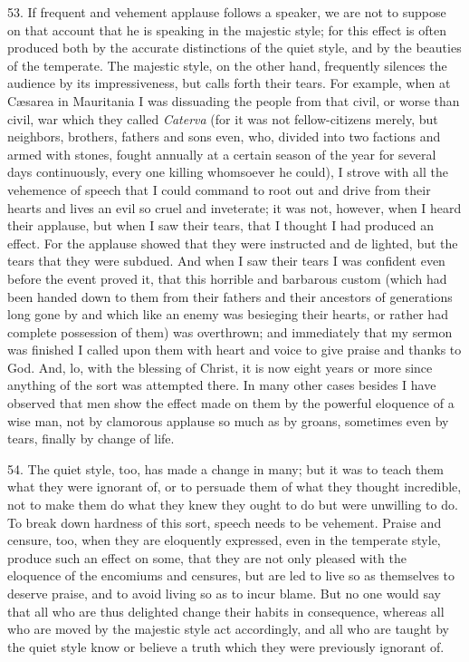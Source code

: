 53. If frequent and vehement applause follows a speaker, we are not to suppose on that account that he is speaking in the majestic style; for this effect is often produced both by the accurate distinctions of the quiet style, and by the beauties of the temperate. The majestic style, on the other hand, frequently silences the audience by its impressiveness, but calls forth their tears. For example, when at Cæsarea in Mauritania I was dissuading the people from that civil, or worse than civil, war which they called \emph{Caterva} (for it was not fellow-citizens merely, but neighbors, brothers, fathers and sons even, who, divided into two factions and armed with stones, fought annually at a certain season of the year for several days continuously, every one killing whomsoever he could), I strove with all the vehemence of speech that I could command to root out and drive from their hearts and lives an evil so cruel and inveterate; it was not, however, when I heard their applause, but when I saw their tears, that I thought I had produced an effect. For the applause showed that they were instructed and de  lighted, but the tears that they were subdued. And when I saw their tears I was confident even before the event proved it, that this horrible and barbarous custom (which had been handed down to them from their fathers and their ancestors of generations long gone by and which like an enemy was besieging their hearts, or rather had complete possession of them) was overthrown; and immediately that my sermon was finished I called upon them with heart and voice to give praise and thanks to God. And, lo, with the blessing of Christ, it is now eight years or more since anything of the sort was attempted there. In many other cases besides I have observed that men show the effect made on them by the powerful eloquence of a wise man, not by clamorous applause so much as by groans, sometimes even by tears, finally by change of life.

54. The quiet style, too, has made a change in many; but it was to teach them what they were ignorant of, or to persuade them of what they thought incredible, not to make them do what they knew they ought to do but were unwilling to do. To break down hardness of this sort, speech needs to be vehement. Praise and censure, too, when they are eloquently expressed, even in the temperate style, produce such an effect on some, that they are not only pleased with the eloquence of the encomiums and censures, but are led to live so as themselves to deserve praise, and to avoid living so as to incur blame. But no one would say that all who are thus delighted change their habits in consequence, whereas all who are moved by the majestic style act accordingly, and all who are taught by the quiet style know or believe a truth which they were previously ignorant of.

